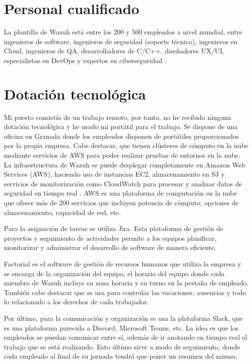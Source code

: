 \section{Personal cualificado}
La plantilla de Wazuh está entre los 200 y 500 empleados a nivel mundial, entre ingenieros de software, ingenieros de seguridad (soporte técnico), ingenieros en Cloud, ingenieros de QA, desarrolladores de C/C++, diseñadores UX/UI, especialistas en DevOps y expertos en ciberseguridad \cite{linkedin_wazuh}.

\section{Dotación tecnológica}
Mi puesto consistía de un trabajo remoto, por tanto, no he recibido ninguna dotación tecnológica y he usado mi portátil para el trabajo. Se dispone de una oficina en Granada donde los empleados disponen de portátiles proporcionados por la propia empresa. Cabe destacar, que tienen clústeres de cómputo en la nube mediante servicios de AWS para poder realizar pruebas de entornos en la nube. La infraestructura de Wazuh se puede desplegar completamente en Amazon Web Services (AWS), haciendo uso de instancias EC2, almacenamiento en S3 y servicios de monitorización como CloudWatch para procesar y analizar datos de seguridad en tiempo real \cite{wazuh_agent_installation}. AWS es una plataforma de computación en la nube que ofrece más de 200 servicios que incluyen potencia de cómputo, opciones de almacenamiento, capacidad de red, etc.

Para la asignación de tareas se utiliza Jira. Esta plataforma de gestión de proyectos y seguimiento de actividades permite a los equipos planificar, monitorizar y administrar el desarrollo de software de manera eficiente.

Factorial es el software de gestión de recursos humanos que utiliza la empresa y se encarga de la organización del equipo, el horario del equipo donde cada miembro de Wazuh incluye su zona horaria y su turno en la pestaña de empleado. También cabe destacar que se usa para controlar las vacaciones, ausencias y todo lo relacionado a los derechos de cada trabajador.

Por último, para la comunicación y organización se usa la plataforma Slack, que es una plataforma parecida a Discord, Microsoft Teams, etc. La idea es que los empleados se puedan comunicar entre sí, además de ir anotando en tiempo real el trabajo que se está realizando. Esto último sirve a modo de seguimiento, donde cada empleado al final de su jornada tendrá que poner un resumen del mismo.